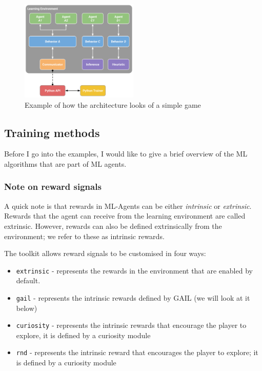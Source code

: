 \documentclass[a4paper,12pt,openright]{book}
\begin{document}
\begin{figure}[h]
\begin{center}
\includegraphics[width=0.5\textwidth]{Images/learning_environment_example.png}
\end{center}
\caption{Example of how the architecture looks of a simple game \cite{MLAgents}}
\label{pic7}
\end{figure}

\subsection{Training methods}

Before I go into the examples, I would like to give a brief overview of the ML algorithms that are part of ML agents.

\subsubsection{Note on reward signals}

A quick note is that rewards in ML-Agents can be either \emph{intrinsic} or \emph{extrinsic}. Rewards that the agent can receive from the learning environment are called extrinsic. However, rewards can also be defined extrinsically from the environment; we refer to these as intrinsic rewards.

The toolkit allows reward signals to be customised in four ways:
\begin{itemize} 
    \item \texttt{extrinsic} - represents the rewards in the environment that are enabled by default. 
    \item \texttt{gail} - represents the intrinsic rewards defined by GAIL (we will look at it below) 
    \item \texttt{curiosity} - represents the intrinsic rewards that encourage the player to explore, it is defined by a curiosity module 
    \item \texttt{rnd} - represents the intrinsic reward that encourages the player to explore; it is defined by a curiosity module
\end{itemize}
\end{document}
